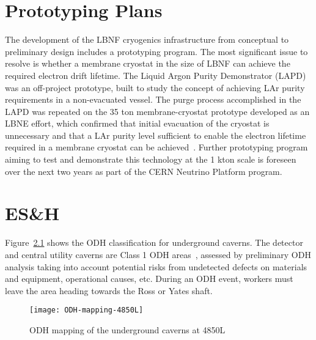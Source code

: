 \chapter{Prototyping Plans}
\label{sec:cryo-cryosys-proto-plans}


The development of the LBNF cryogenics infrastructure from conceptual 
to preliminary design includes a prototyping program. The most 
significant issue to resolve is whether a membrane cryostat in
the size of LBNF can achieve the required electron drift lifetime. 
The Liquid Argon Purity Demonstrator (LAPD) was an 
off-project prototype, built to study the concept of achieving
LAr purity requirements in a non-evacuated vessel. 
The purge process accomplished in the LAPD was 
repeated on the 35 ton membrane-cryostat prototype 
developed as an LBNE effort, which confirmed that initial 
evacuation of the cryostat is unnecessary and that 
a LAr purity level sufficient to enable the electron lifetime 
required in a membrane cryostat can be achieved~\cite{Montanari:2013/06/13aqa}.
Further prototyping program aiming to test and demonstrate 
this technology at the 1 kton scale is foreseen over the
next two years as part of the CERN Neutrino Platform program.

\chapter{ES\&H}
\label{sec:cryo-cryosys-esh}

Figure~\ref{fig:ODH-mapping-4850L} shows the ODH classification for
underground caverns. The detector and central utility caverns
are Class 1 ODH areas~\cite{feshm},
assessed by preliminary ODH analysis taking into account
potential risks from undetected defects on materials
and equipment, operational causes, etc.
During an ODH event, workers must leave the area heading towards the Ross or Yates shaft.

\begin{figure}[htbp]
\centering
\texttt{[image: ODH-mapping-4850L]}
\caption{ODH mapping of the underground caverns at 4850L} 
\label{fig:ODH-mapping-4850L}
\end{figure}

